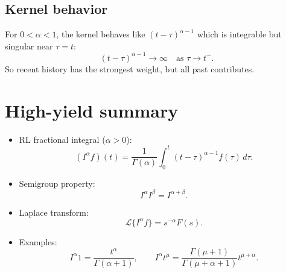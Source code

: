 \subsection{Kernel behavior}
For $0<\alpha<1$, the kernel behaves like $(t-\tau)^{\alpha-1}$ which is integrable but singular
near $\tau=t$:
\[
(t-\tau)^{\alpha-1}\to \infty \quad \text{as }\tau\to t^-.
\]
So recent history has the strongest weight, but all past contributes.


\section{High-yield summary}

\begin{itemize}
\item RL fractional integral ($\alpha>0$):
\[
(I^\alpha f)(t)=\frac{1}{\Gamma(\alpha)}\int_0^t (t-\tau)^{\alpha-1}f(\tau)\,d\tau.
\]
\item Semigroup property:
\[
I^\alpha I^\beta = I^{\alpha+\beta}.
\]
\item Laplace transform:
\[
\mathcal{L}\{I^\alpha f\}=s^{-\alpha}F(s).
\]
\item Examples:
\[
I^\alpha 1 = \frac{t^\alpha}{\Gamma(\alpha+1)},\qquad
I^\alpha t^\mu = \frac{\Gamma(\mu+1)}{\Gamma(\mu+\alpha+1)}t^{\mu+\alpha}.
\]
\end{itemize}
